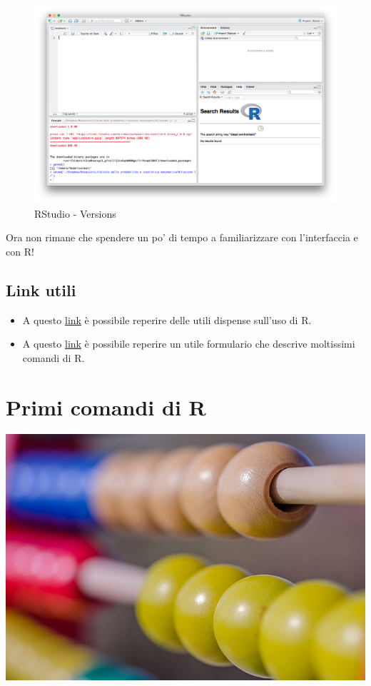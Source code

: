 \documentclass[]{book}
\providecommand{\tightlist}{%
  \setlength{\itemsep}{0pt}\setlength{\parskip}{0pt}}
\begin{document}
\begin{figure}
\centering
\includegraphics{./media/Rstudio_4tab.png}
\caption{RStudio - Versions}
\end{figure}

Ora non rimane che spendere un po' di tempo a familiarizzare con l'interfaccia e con R!

\hypertarget{link-utili}{%
\section{Link utili}\label{link-utili}}

\begin{itemize}
\tightlist
\item
  A questo \href{https://cran.r-project.org/doc/contrib/Mineo-dispensaR.pdf}{link} è possibile reperire delle utili dispense sull'uso di R.
\item
  A questo \href{https://cran.r-project.org/doc/contrib/Frascati-FormularioStatisticaR.pdf}{link} è possibile reperire un utile formulario che descrive moltissimi comandi di R.
\end{itemize}

\hypertarget{primi-comandi-di-r}{%
\chapter{Primi comandi di R}\label{primi-comandi-di-r}}

\includegraphics{./media/abacus.jpg}
\end{document}
